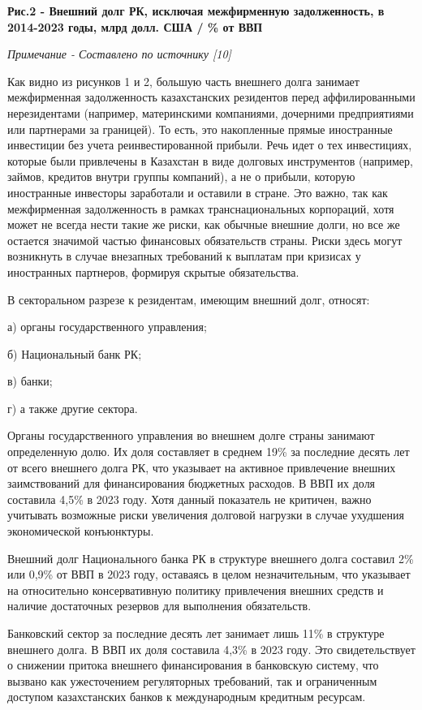{\bfseries Рис.2 - Внешний долг РК, исключая межфирменную задолженность, в 2014-2023 годы, млрд долл. США / \% от ВВП}

\emph{Примечание - Составлено по источнику {[}10{]}}

\begin{multicols}{2}
Как видно из рисунков 1 и 2, большую часть внешнего долга занимает
межфирменная задолженность казахстанских резидентов перед
аффилированными нерезидентами (например, материнскими компаниями,
дочерними предприятиями или партнерами за границей). То есть, это
накопленные прямые иностранные инвестиции без учета реинвестированной
прибыли. Речь идет о тех инвестициях, которые были привлечены в
Казахстан в виде долговых инструментов (например, займов, кредитов
внутри группы компаний), а не о прибыли, которую иностранные инвесторы
заработали и оставили в стране. Это важно, так как межфирменная
задолженность в рамках транснациональных корпораций, хотя может не
всегда нести такие же риски, как обычные внешние долги, но все же
остается значимой частью финансовых обязательств страны. Риски здесь
могут возникнуть в случае внезапных требований к выплатам при кризисах у
иностранных партнеров, формируя скрытые обязательства.

В секторальном разрезе к резидентам, имеющим внешний долг, относят:

а) органы государственного управления;

б) Национальный банк РК;

в) банки;

г) а также другие сектора.

Органы государственного управления во внешнем долге страны занимают
определенную долю. Их доля составляет в среднем 19\% за последние десять
лет от всего внешнего долга РК, что указывает на активное привлечение
внешних заимствований для финансирования бюджетных расходов. В ВВП их
доля составила 4,5\% в 2023 году. Хотя данный показатель не критичен,
важно учитывать возможные риски увеличения долговой нагрузки в случае
ухудшения экономической конъюнктуры.

Внешний долг Национального банка РК в структуре внешнего долга составил
2\% или 0,9\% от ВВП в 2023 году, оставаясь в целом незначительным, что
указывает на относительно консервативную политику привлечения внешних
средств и наличие достаточных резервов для выполнения обязательств.

Банковский сектор за последние десять лет занимает лишь 11\% в структуре
внешнего долга. В ВВП их доля составила 4,3\% в 2023 году. Это
свидетельствует о снижении притока внешнего финансирования в банковскую
систему, что вызвано как ужесточением регуляторных требований, так и
ограниченным доступом казахстанских банков к международным кредитным
ресурсам.


\end{multicols}
